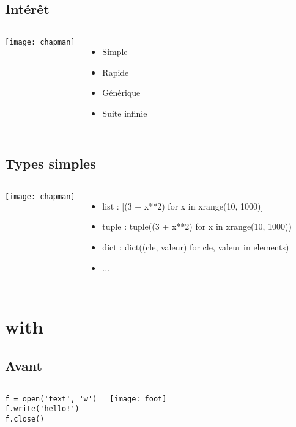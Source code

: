 \documentclass[handout]{beamer}
\begin{document}
\subsection{Intérêt}
\begin{frame}
    \begin{columns}[c]
        \texttt{[image: chapman]}
        \begin{itemize}
        \item Simple
        \item Rapide
        \item Générique
        \item Suite infinie
        \end{itemize}
    \end{columns}
\end{frame}

\subsection{Types simples}
\begin{frame}
    \begin{columns}[c]
        \texttt{[image: chapman]}
        \begin{itemize}
        \item list : [(3 + x**2) for x in xrange(10, 1000)]
        \item tuple : tuple((3 + x**2) for x in xrange(10, 1000))
        \item dict : dict((cle, valeur) for cle, valeur in elements)
        \item ...
        \end{itemize}
    \end{columns}
\end{frame}

\section{with}

\subsection{Avant}
\begin{frame}[fragile]
    \begin{columns}[c]
        \begin{verbatim}
f = open('text', 'w')
f.write('hello!')
f.close()
        \end{verbatim}
        \texttt{[image: foot]}
    \end{columns}
\end{frame}
\end{document}
